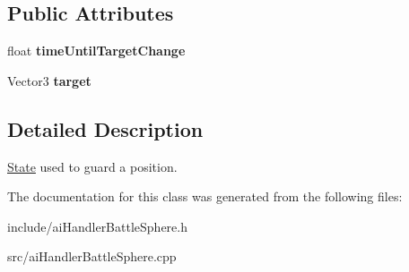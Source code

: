 \subsection*{\-Public \-Attributes}
\begin{DoxyCompactItemize}
\item 
\hypertarget{classAIStateBattleSphereGuard_a93477bb5a6576daa69f84170ad02b364}{
float {\bfseries time\-Until\-Target\-Change}}
\label{d0/d5c/classAIStateBattleSphereGuard_a93477bb5a6576daa69f84170ad02b364}

\item 
\hypertarget{classAIStateBattleSphereGuard_acf0f11994c5531971b0cdf9fe6645388}{
\-Vector3 {\bfseries target}}
\label{d0/d5c/classAIStateBattleSphereGuard_acf0f11994c5531971b0cdf9fe6645388}

\end{DoxyCompactItemize}


\subsection{\-Detailed \-Description}
\hyperlink{classState}{\-State} used to guard a position. 

\-The documentation for this class was generated from the following files\-:\begin{DoxyCompactItemize}
\item 
include/ai\-Handler\-Battle\-Sphere.\-h\item 
src/ai\-Handler\-Battle\-Sphere.\-cpp\end{DoxyCompactItemize}
